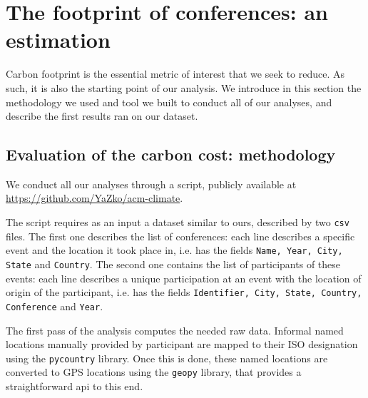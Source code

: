 \section{The footprint of conferences: an estimation}

Carbon footprint is the essential metric of interest that we seek to reduce.
As such, it is also the starting point of our analysis.
We introduce in this section the methodology we used and tool we built to
conduct all of our analyses, and describe the first results ran on our dataset.

\subsection{Evaluation of the carbon cost: methodology}
\label{sec:methodo}


We conduct all our analyses through a \python{} script, publicly available at
\url{https://github.com/YaZko/acm-climate}.

The script requires as an input a dataset similar to ours, described by two
\texttt{csv} files. The first one describes the list of conferences: each line
describes a specific event and the location it took place in, i.e. has the
fields \texttt{Name, Year, City, State} and \texttt{Country}. The second one
contains the list of participants of these events: each line describes a unique
participation at an event with the location of origin of the participant, i.e.
has the fields \texttt{Identifier, City, State, Country, Conference} and
\texttt{Year}.

The first pass of the analysis computes the needed raw data. 
Informal named locations manually provided by participant are mapped to their
ISO designation using the \texttt{pycountry} library.
Once this is done, these named locations are converted to GPS
locations using the \texttt{geopy} library, that provides a straightforward api
to this end.


